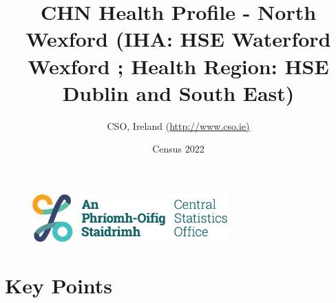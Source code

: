 \documentclass{article}
\title{CHN Health Profile - North Wexford (IHA: HSE Waterford Wexford ;  Health Region: HSE Dublin and South East) }
\date{Census 2022}
\author{CSO, Ireland  (\url{http://www.cso.ie)}}
\begin{document}


\begin{figure}
	\centering
\includegraphics[width =75mm]{../figures/CSO_Logo.png}
\end{figure}

				 
		   
						  
														  
																																													
												 
			 
\maketitle
					
													   
				 
						 
																																																																											   
				 
				  
  \pagebreak
    	    \tableofcontents

\pagebreak


\section{Key Points}
\end{document}

